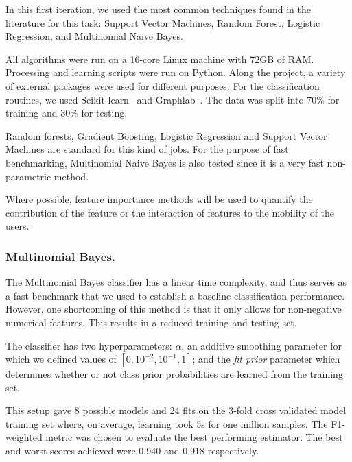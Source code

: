 In this first iteration, we used the most common techniques found in the literature for this task:
Support Vector Machines, Random Forest, Logistic Regression, and Multinomial Naive Bayes.

All algorithms were run on a 16-core Linux machine with 72GB of RAM.  Processing and learning scripts were run on Python. %
Along the project, a variety of external packages were used for different purposes. For the classification routines, we used Scikit-learn~\cite{sklearn} and Graphlab~\cite{graphlab}.
The data was split into 70\% for training and 30\% for testing.



Random forests, Gradient Boosting, Logistic Regression and Support Vector Machines are standard for this kind of jobs. For the purpose of fast benchmarking, Multinomial Naive Bayes is also tested since it is a very fast non-parametric method. 

Where possible, feature importance methods will be used to quantify the contribution of the feature or the interaction of features to the mobility of the users.




\subsubsection{Multinomial Bayes.}
 
 The Multinomial Bayes classifier has a linear time complexity, and thus serves as a fast benchmark that we used to establish a baseline classification performance. However, one shortcoming of this method is that it only allows for non-negative numerical features. This results in a reduced training and testing set.
  
 The classifier has two hyperparameters: $\alpha$, an additive smoothing parameter for which we defined values of $[0,{10^{-2}},{10^{-1}},1]$; and the \textit{fit prior} parameter which determines whether or not class prior probabilities are learned from the training set. 
 
 This setup gave 8 possible models and 24 fits on the 3-fold cross validated model training set where, on average, learning took 5s for one million samples. The F1-weighted metric was chosen to evaluate the best performing estimator.
The best and worst scores achieved were 0.940 and 0.918 respectively. 

